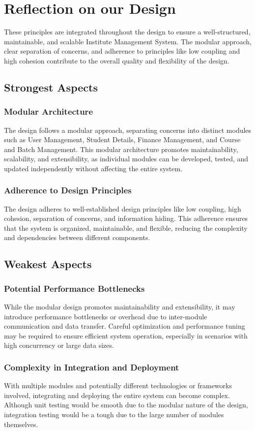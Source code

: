 \documentclass[11pt]{article}
\begin{document}
\section{Reflection on our Design}

These principles are integrated throughout the design to ensure a well-structured, maintainable, and scalable Institute Management System. The modular approach, clear separation of concerns, and adherence to principles like low coupling and high cohesion contribute to the overall quality and flexibility of the design.

\subsection{Strongest Aspects}


\subsubsection{Modular Architecture}
The design follows a modular approach, separating concerns into distinct modules such as User Management, Student Details, Finance Management, and Course and Batch Management. This modular architecture promotes maintainability, scalability, and extensibility, as individual modules can be developed, tested, and updated independently without affecting the entire system.

\subsubsection{Adherence to Design Principles}
The design adheres to well-established design principles like low coupling, high cohesion, separation of concerns, and information hiding. This adherence ensures that the system is organized, maintainable, and flexible, reducing the complexity and dependencies between different components.

\subsection{Weakest Aspects}

\subsubsection{Potential Performance Bottlenecks}
While the modular design promotes maintainability and extensibility, it may introduce performance bottlenecks or overhead due to inter-module communication and data transfer. Careful optimization and performance tuning may be required to ensure efficient system operation, especially in scenarios with high concurrency or large data sizes.

\subsubsection{Complexity in Integration and Deployment}
With multiple modules and potentially different technologies or frameworks involved, integrating and deploying the entire system can become complex. Although unit testing would be smooth due to the modular nature of the design, integration testing would be a tough due to the large number of modules themselves.
\end{document}
